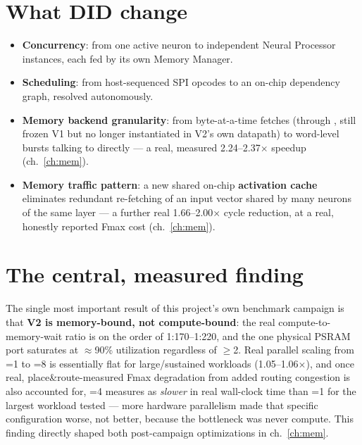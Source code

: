 \section{What DID change}
\begin{itemize}
\item \textbf{Concurrency}: from one active neuron to 
      independent Neural Processor instances, each fed by its own Memory
      Manager.
\item \textbf{Scheduling}: from host-sequenced SPI opcodes to an on-chip
      dependency graph, resolved autonomously.
\item \textbf{Memory backend granularity}: from byte-at-a-time fetches
      (through , still frozen V1 but no
      longer instantiated in V2's own datapath) to word-level bursts
      talking to  directly --- a real, measured
      2.24--2.37$\times$ speedup (ch.~\ref{ch:mem}).
\item \textbf{Memory traffic pattern}: a new shared on-chip
      \textbf{activation cache} eliminates redundant re-fetching of an
      input vector shared by many neurons of the same layer --- a
      further real 1.66--2.00$\times$ cycle reduction, at a real, honestly
      reported Fmax cost (ch.~\ref{ch:mem}).
\end{itemize}

\section{The central, measured finding}
The single most important result of this project's own benchmark
campaign is that \textbf{V2 is memory-bound, not compute-bound}: the
real compute-to-memory-wait ratio is on the order of 1:170--1:220, and
the one physical PSRAM port saturates at $\approx$90\% utilization
regardless of $\ge$2. Real parallel scaling from
=1 to =8 is essentially flat for
large/sustained workloads (1.05--1.06$\times$), and once real,
place\&route-measured Fmax degradation from added routing congestion is
also accounted for, =4 measures as \emph{slower} in real
wall-clock time than =1 for the largest workload tested
--- more hardware parallelism made that specific configuration worse,
not better, because the bottleneck was never compute. This finding
directly shaped both post-campaign optimizations in ch.~\ref{ch:mem}.

